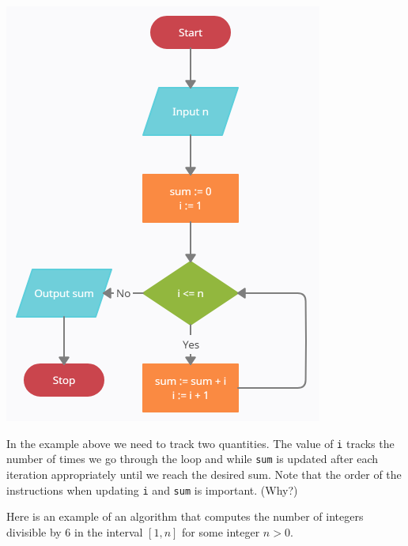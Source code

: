 \documentclass{ximera}
\begin{document}
\begin{center}
	\includegraphics{gausssum.png}
\end{center}

In the example above we need to track two quantities. The value of \verb|i| tracks the number of times we go through the loop and while \verb|sum| is updated after each iteration appropriately until we reach the desired sum. Note that the order of the instructions when updating \verb|i| and \verb|sum| is important. (Why?) 

Here is an example of an algorithm that computes the number of integers divisible by 6 in the interval $[1,n]$ for some integer $n>0$.
\end{document}
